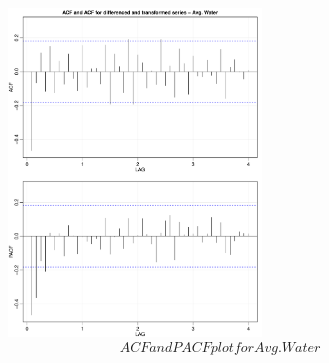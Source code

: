 \documentclass[a4paper]{article}
\begin{document}
\begin{figure}
	\centering
	\includegraphics[width=0.6\textwidth]{acf2_Water}
	\caption{$$ACF and PACF plot for Avg. Water$$}
	\label{fig1:acf2_Water}
\end{figure}

\newpage
\end{document}
